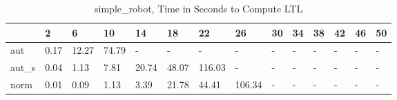 \begin{table}
\caption{simple_robot, Time in Seconds to Compute LTL}
\label{simple_robot_LTL_time}
\begin{tabular}{llllllllllllll}
\toprule
 & 2 & 6 & 10 & 14 & 18 & 22 & 26 & 30 & 34 & 38 & 42 & 46 & 50 \\
\midrule
aut & 0.17 & 12.27 & 74.79 & - & - & - & - & - & - & - & - & - & - \\
aut_s & 0.04 & 1.13 & 7.81 & 20.74 & 48.07 & 116.03 & - & - & - & - & - & - & - \\
norm & 0.01 & 0.09 & 1.13 & 3.39 & 21.78 & 44.41 & 106.34 & - & - & - & - & - & - \\
\bottomrule
\end{tabular}
\end{table}

